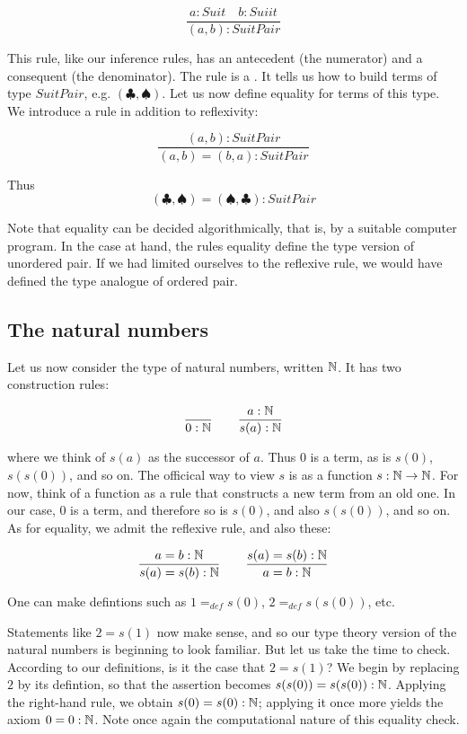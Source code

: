 $$
\frac{a : Suit \quad b : Suiit}{(a,b) : SuitPair}
$$

This rule, like our inference rules, has an antecedent (the numerator) and a consequent (the denominator).  The rule is a .  It tells us how to build terms of type $SuitPair$, e.g. $(\clubsuit, \spadesuit)$.  Let us now define equality for terms of this type.  We introduce a rule in addition to reflexivity:

$$
\frac{(a,b) : SuitPair }{(a,b) = (b,a) : SuitPair}
$$

Thus
$$(\clubsuit, \spadesuit) = (\spadesuit, \clubsuit) : SuitPair
$$

Note that equality can be decided algorithmically, that is, by a suitable computer program.  In the case at hand, the rules equality define the type version of unordered pair.  If we had limited ourselves to the reflexive rule, we would have defined the type analogue of ordered pair.

\subsection{The natural numbers}


Let us now consider the type of natural numbers, written $\mathbb{N}$.  It has two construction rules:

$$
\frac{}{0 : \mathbb{N} } \qquad \frac{a : \mathbb{N}}{s(a) : \mathbb{N}}
$$

where we think of $s(a)$ as the successor of $a$.  Thus $0$ is a term, as is $s(0)$, $s(s(0))$, and so on.  The officical way to view $s$ is as a function $s : \mathbb{N} \to \mathbb{N}$.  For now, think of a function as a rule that constructs a new term from an old one.  In our case, $0$ is a term, and therefore so is $s(0)$, and also $s(s(0))$, and so on.  As for equality, we admit the reflexive rule, and also these:

$$
\frac{a = b : \mathbb{N}}{s(a)  = s(b) : \mathbb{N}}
\qquad
\frac{s(a)  = s(b) : \mathbb{N}}{a = b : \mathbb{N}}
$$

One can make defintions such as $1 =_{def}  s(0)$, $2 =_{def}  s(s(0))$, etc.

Statements like $2 = s(1)$ now make sense, and so our type theory version of the natural numbers is beginning to look familiar.   But let us take the time to check.  According to our definitions, is it the case that $2 = s(1)$?  We begin by replacing $2$ by its defintion, so that the assertion becomes $s(s(0)) = s(s(0)): \mathbb{N}$.  Applying the right-hand rule, we obtain $s(0) = s(0): \mathbb{N}$; applying it once more yields the axiom $0 = 0 : \mathbb{N}$. Note once again the computational nature of this equality check.


